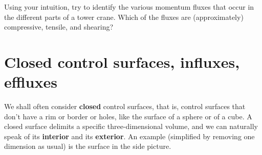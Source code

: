 \documentclass[a4paper,12pt,%
onecolumn,oneside,%
british%
]{memoir}
\renewcommand*{\|}[1][]{\nonscript\:#1\vert\nonscript\:\mathopen{}}
\begin{document}
\begin{exercise}
  Using your intuition, try to identify the various momentum fluxes that occur in the different parts of a tower crane. Which of the fluxes are (approximately) compressive, tensile, and shearing?
\end{exercise}



\section{Closed control surfaces, influxes, effluxes}
\label{sec:in_out_flux}

We shall often consider \textbf{closed} control surfaces, that is, control surfaces that don't have a rim or border or holes, like the surface of a sphere or of a cube. A closed surface delimits a specific three-dimensional volume, and we can naturally speak of its \textbf{interior} and its \textbf{exterior}. An example (simplified by removing one dimension as usual) is the surface in the side picture.

\end{document}
